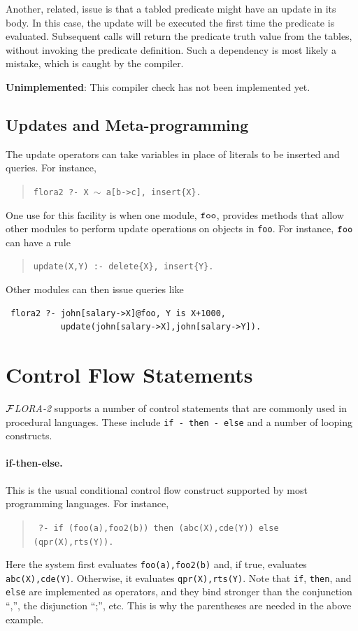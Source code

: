 \documentclass[11pt]{article}
\newcommand{\FLORA}{{\mbox{${\cal F}${\small\it LORA}\rm\emph{-2}}}\xspace}
\begin{document}
Another, related, issue is that a tabled predicate might have an update in
its body. In this case, the update will be executed the first time the
predicate is evaluated. Subsequent calls will return the predicate truth
value from the tables, without invoking the predicate definition.
Such a dependency is most likely a mistake, which is caught by the
compiler.

{\bf Unimplemented}: This compiler check has not been implemented yet.

\subsection{Updates and Meta-programming}

The update operators can take variables in place of literals to be inserted
and queries. For instance, 
\begin{quote}
 {\tt flora2 ?-  X $\sim$ a[b->c], insert\{X\}.}
\end{quote}
One use for this facility is when one module, $\tt foo$, provides methods that
allow other modules to perform update operations on objects in {\tt foo}.
For instance, $\tt foo$ can have a rule
\begin{quote}
 {\tt update(X,Y) :- delete\{X\}, insert\{Y\}.}  
\end{quote}
Other modules can then issue queries like
\begin{verbatim}
 flora2 ?- john[salary->X]@foo, Y is X+1000,
           update(john[salary->X],john[salary->Y]).  
\end{verbatim}

\section{Control Flow Statements}\label{sec:control}

\FLORA supports a number of control statements that are commonly used in
procedural languages. These include {\tt if - then - else} and 
a number of looping constructs.

\paragraph{if-then-else.}
This is the usual conditional control flow
construct supported by most programming languages.  For instance,
\begin{quote}
 \tt
 ?- if (foo(a),foo2(b)) then (abc(X),cde(Y)) else (qpr(X),rts(Y)).
\end{quote}
Here the system first evaluates {\tt foo(a),foo2(b)} and, if true,
evaluates {\tt abc(X),cde(Y)}. Otherwise, it evaluates {\tt qpr(X),rts(Y)}.
Note that {\tt if}, {\tt then}, and {\tt else} are implemented as
operators, and they bind stronger than the conjunction ``,'', the
disjunction ``;'', etc. This is why the parentheses are needed in the above
example.
\end{document}
